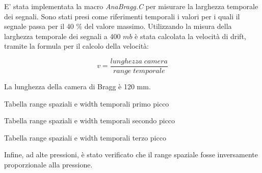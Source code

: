 E' stata implementata la macro \textit{AnaBragg.C} per misurare la larghezza temporale dei segnali. Sono stati presi come riferimenti temporali i valori per i quali il segnale
passa per il 40 \% del valore massimo. Utilizzando la misura della larghezza temporale dei segnali a 400 $mb$ è stata calcolata la velocità di drift, 
tramite la formula per il calcolo della velocità:

$$ v=\frac{lunghezza\;camera}{range\; temporale} $$

La lunghezza della camera di Bragg è 120 mm.
\begin{tabella}
 \centering
  
 \caption{Tabella range spaziali e width temporali primo picco}
 \label{tab:range_picco1.tex}
\end{tabella}

\begin{tabella}
 \centering
  
 \caption{Tabella range spaziali e width temporali secondo picco}
 \label{tab:range_picco2.tex}
\end{tabella}

\begin{tabella}
 \centering
  
 \caption{Tabella range spaziali e width temporali terzo picco}
 \label{tab:range_picco3.tex}
\end{tabella}

Infine, ad alte pressioni, è stato verificato che il range spaziale fosse inversamente proporzionale alla pressione.